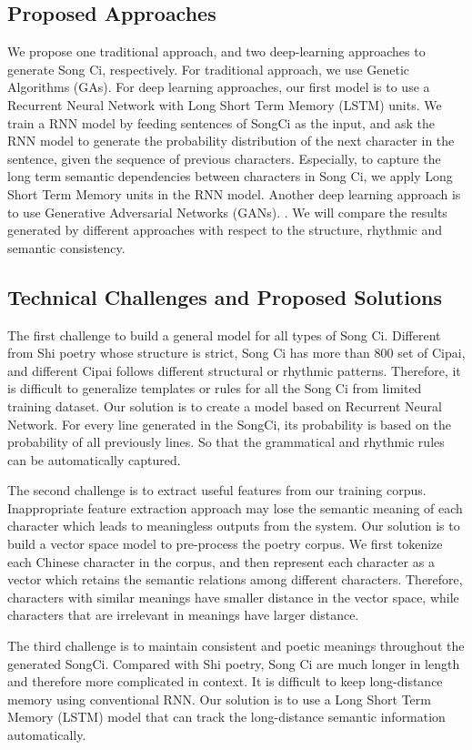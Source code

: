 \subsection{Proposed Approaches}
%
We propose one traditional approach, and two deep-learning approaches to generate Song Ci, respectively.
%
For traditional approach, we use Genetic Algorithms (GAs).
%
For deep learning approaches, our first model is to use a Recurrent Neural Network  with Long Short Term Memory (LSTM) units.
%
We train a RNN model by feeding sentences of SongCi as the input, and ask the RNN model to generate the probability distribution of the next character in the sentence, given the sequence of previous characters.
%
Especially, to capture the long term semantic dependencies between characters in Song Ci,
%
we apply Long Short Term Memory units in the RNN model.
Another deep learning approach is to use Generative Adversarial Networks (GANs).
%
.
%
We will compare the results generated by different approaches with respect to the structure, rhythmic and semantic consistency.

\subsection{Technical Challenges and Proposed Solutions}
The first challenge to build a general model for all types of Song Ci.
%
Different from Shi poetry whose structure is strict,  Song Ci has more than 800 set of Cipai, and different Cipai follows different structural or rhythmic patterns.
%
Therefore, it is difficult to generalize templates or rules for all the Song Ci from limited training dataset.
%
Our solution is to create a model based on Recurrent Neural Network. For every line generated in the SongCi, its probability is based on the probability of all previously lines.
%
So that the grammatical and rhythmic rules can be automatically captured.


The second challenge is to extract useful features from our training corpus.
%
Inappropriate feature extraction approach may lose the semantic meaning of each character which leads to meaningless outputs from the system.
%
Our solution is to build a vector space model to pre-process the poetry corpus. We first tokenize each Chinese character in the corpus, and then represent each character as a vector which retains the semantic relations among different characters. Therefore, characters with similar meanings have smaller distance in the vector space, while characters that are irrelevant in meanings have larger distance.


The third challenge is to maintain consistent and poetic meanings throughout the generated SongCi.
%
Compared with Shi poetry, Song Ci are much longer in length and therefore more complicated in context.
%
It is difficult to keep long-distance memory using conventional RNN.
%
Our solution is to use a Long Short Term Memory (LSTM) model that can track the long-distance semantic information automatically.
